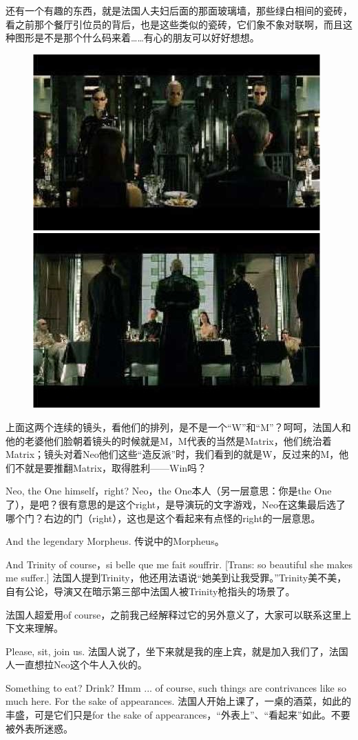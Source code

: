 \documentclass[UTF8]{ctexart}
\begin{document}
还有一个有趣的东西，就是法国人夫妇后面的那面玻璃墙，那些绿白相间的瓷砖，看之前那个餐厅引位员的背后，也是这些类似的瓷砖，它们象不象对联啊，而且这种图形是不是那个什么码来着……有心的朋友可以好好想想。

\begin{figure}[htb]
\centering
\includegraphics[width=0.45\linewidth]{fig/read_reloaded-91}
\includegraphics[width=0.45\linewidth]{fig/read_reloaded-91-1}
\end{figure}

上面这两个连续的镜头，看他们的排列，是不是一个“W”和“M”？呵呵，法国人和他的老婆他们脸朝着镜头的时候就是M，M代表的当然是Matrix，他们统治着Matrix；镜头对着Neo他们这些“造反派”时，我们看到的就是W，反过来的M，他们不就是要推翻Matrix，取得胜利——Win吗？

Neo, the One himself，right? Neo，the One本人（另一层意思：你是the One了），是吧？很有意思的是这个right，是导演玩的文字游戏，Neo在这集最后选了哪个门？右边的门（right），这也是这个看起来有点怪的right的一层意思。

And the legendary Morpheus. 传说中的Morpheus。

And Trinity of course，si belle que me fait souffrir. [Trans: so beautiful she makes me suffer.] 法国人提到Trinity，他还用法语说“她美到让我受罪。”Trinity美不美，自有公论，导演又在暗示第三部中法国人被Trinity枪指头的场景了。

法国人超爱用of course，之前我己经解释过它的另外意义了，大家可以联系这里上下文来理解。

Please, sit, join us. 法国人说了，坐下来就是我的座上宾，就是加入我们了，法国人一直想拉Neo这个牛人入伙的。

Something to eat? Drink? Hmm ... of course, such things are contrivances like so much here. For the sake of appearances. 法国人开始上课了，一桌的酒菜，如此的丰盛，可是它们只是for the sake of appearances，“外表上”、“看起来”如此。不要被外表所迷惑。
\end{document}
